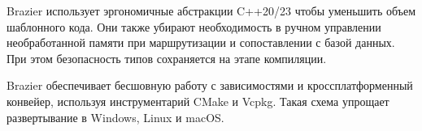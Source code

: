 \documentclass[14pt]{extarticle}
\begin{document}
Brazier использует эргономичные абстракции C++20/23 чтобы уменьшить объем шаблонного кода. Они также убирают необходимость в ручном управлении необработанной памяти при маршрутизации и сопоставлении с базой данных. При этом безопасность типов сохраняется на этапе компиляции.

Brazier обеспечивает бесшовную работу с зависимостями и кроссплатформенный конвейер, используя инструментарий CMake и Vcpkg. Такая схема упрощает развертывание в Windows, Linux и macOS\@.

\pagebreak
\printbibliography{}
\end{document}
